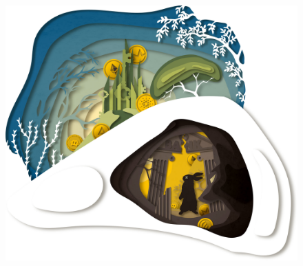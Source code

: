 \begin{figure}
\centering
    \includegraphics[width=\textwidth]{illustrations/resized_CRYPTO_KEY_1_PART_2.jpg}
\end{figure}


